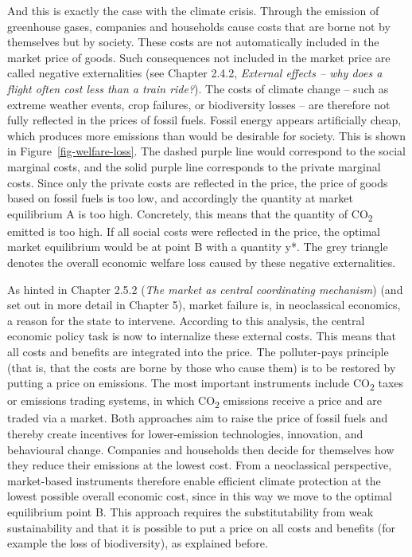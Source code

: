 \documentclass[
  british,
  a4paper,
  DIV=11,
  numbers=noendperiod,
  oneside,
  openany]{scrreprt}
\begin{document}
And this is exactly the case with the climate crisis. Through the
emission of greenhouse gases, companies and households cause costs that
are borne not by themselves but by society. These costs are not
automatically included in the market price of goods. Such consequences
not included in the market price are called negative externalities (see
Chapter 2.4.2, \emph{External effects -- why does a flight often cost
less than a train ride?}). The costs of climate change -- such as
extreme weather events, crop failures, or biodiversity losses -- are
therefore not fully reflected in the prices of fossil fuels. Fossil
energy appears artificially cheap, which produces more emissions than
would be desirable for society. This is shown in
Figure~\ref{fig-welfare-loss}. The dashed purple line would correspond
to the social marginal costs, and the solid purple line corresponds to
the private marginal costs. Since only the private costs are reflected
in the price, the price of goods based on fossil fuels is too low, and
accordingly the quantity at market equilibrium A is too high.
Concretely, this means that the quantity of CO\textsubscript{2} emitted
is too high. If all social costs were reflected in the price, the
optimal market equilibrium would be at point B with a quantity y*. The
grey triangle denotes the overall economic welfare loss caused by these
negative externalities.

As hinted in Chapter 2.5.2 (\emph{The market as central coordinating
mechanism}) (and set out in more detail in Chapter 5), market failure
is, in neoclassical economics, a reason for the state to intervene.
According to this analysis, the central economic policy task is now to
internalize these external costs. This means that all costs and benefits
are integrated into the price. The polluter-pays principle (that is,
that the costs are borne by those who cause them) is to be restored by
putting a price on emissions. The most important instruments include
CO\textsubscript{2} taxes or emissions trading systems, in which
CO\textsubscript{2} emissions receive a price and are traded via a
market. Both approaches aim to raise the price of fossil fuels and
thereby create incentives for lower-emission technologies, innovation,
and behavioural change. Companies and households then decide for
themselves how they reduce their emissions at the lowest cost. From a
neoclassical perspective, market-based instruments therefore enable
efficient climate protection at the lowest possible overall economic
cost, since in this way we move to the optimal equilibrium point B. This
approach requires the substitutability from weak sustainability and that
it is possible to put a price on all costs and benefits (for example the
loss of biodiversity), as explained before.
\end{document}
